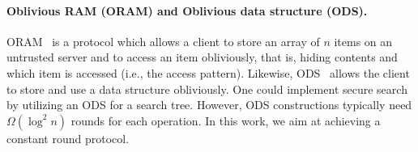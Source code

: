 



\paragraph{Oblivious RAM (ORAM) and Oblivious data structure (ODS).} 
ORAM~\cite{GO96} is a protocol which allows a client to store an array
of $n$ items on an untrusted server and to access an item obliviously,
that is, hiding contents and which item is accessed (i.e., the access
pattern).  Likewise, ODS~\cite{CCS:WNLCSS14} allows the client to store
and use a data structure obliviously. 
%
One could implement secure search by utilizing an ODS for a search tree.
However, ODS constructions typically need $\Omega(\log^2 n)$ rounds for
each operation. In this work, we aim at achieving a constant round
protocol. 


